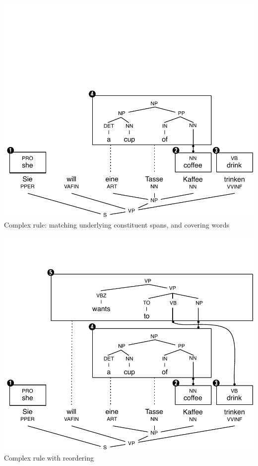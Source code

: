 \documentclass[landscape]{slides}
\begin{document}

\vspace{-31mm}
\begin{center}
\includegraphics[scale=1.15]{chart-parsing4.pdf}\\
Complex rule: matching underlying constituent spans, and covering words
\end{center}


\vspace{-31mm}
\begin{center}
\includegraphics[scale=1.15]{chart-parsing5.pdf}\\
Complex rule with reordering
\end{center}
\end{document}
